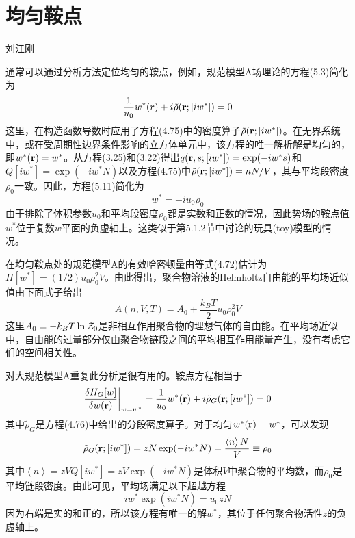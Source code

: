 \section{均匀鞍点}
{\color{red}\begin{center}
    刘江刚
    \end{center}}

通常可以通过分析方法定位均匀的鞍点，例如，规范模型A场理论的方程(5.3)简化为
\begin{equation}
\frac{1}{u_0}w^*(r)+i\tilde{\rho}(\mathbf{r};[iw^*])=0
\end{equation}
这里，在构造函数导数时应用了方程(4.75)中的密度算子$\tilde{\rho}(\mathbf{r};[iw^*])$。在无界系统中，或在受周期性边界条件影响的立方体单元中，该方程的唯一解析解是均匀的，即$w^*(\mathbf{r})=w^*$。从方程(3.25)和(3.22)得出$q(\mathbf{r},s;[iw^*])=\exp(-iw^*s)$和$Q[iw^*]=\exp(-iw^*N)$以及方程(4.75)中$\tilde{\rho}(\mathbf{r};[iw^*])=nN/V$，其与平均段密度$\rho_0$一致。因此，方程(5.11)简化为
\begin{equation}
w^*=-iu_0\rho_0
\end{equation}
由于排除了体积参数$u_0$和平均段密度$\rho_0$都是实数和正数的情况，因此势场的鞍点值$w^*$位于复数$w$平面的负虚轴上。这类似于第5.1.2节中讨论的玩具(toy)模型的情况。

在均匀鞍点处的规范模型A的有效哈密顿量由等式(4.72)估计为$H[w^*]=(1/2)u_0\rho_0^2V$。由此得出，聚合物溶液的Helmholtz自由能的平均场近似值由下面式子给出
\begin{equation}
A(n,V,T)=A_0+\frac{k_BT}{2}u_0\rho_0^2V
\end{equation}
这里$A_0=-k_BT\ln\mathcal{Z}_0$是非相互作用聚合物的理想气体的自由能。在平均场近似中，自由能的过量部分仅由聚合物链段之间的平均相互作用能量产生，没有考虑它们的空间相关性。

对大规范模型A重复此分析是很有用的。鞍点方程相当于
\begin{equation}
\frac{\delta H_G[w]}{\delta w(\mathbf{r})}\bigg|_{w=w^*}=\frac{1}{u_0}w^*(\mathbf{r})+i\tilde{\rho}_G(\mathbf{r};[iw^*])=0
\end{equation}
其中$\tilde{\rho}_G$是方程(4.76)中给出的分段密度算子。对于均匀$w^*(\mathbf{r})=w^*$，可以发现
\begin{equation}
\tilde{\rho}_G(\mathbf{r};[iw^*])=zN\exp(-iw^*N)=\frac{\left\langle n\right\rangle N}{V}\equiv\rho_0
\end{equation}
其中$\left\langle n\right\rangle=zVQ[iw^*]=zV\exp(-iw^*N)$是体积$V$中聚合物的平均数，而$\rho_0$是平均链段密度。由此可见，平均场满足以下超越方程
\begin{equation}
iw^*\exp(iw^*N)=u_0zN
\end{equation}
因为右端是实的和正的，所以该方程有唯一的解$w^*$，其位于任何聚合物活性$z$的负虚轴上。

